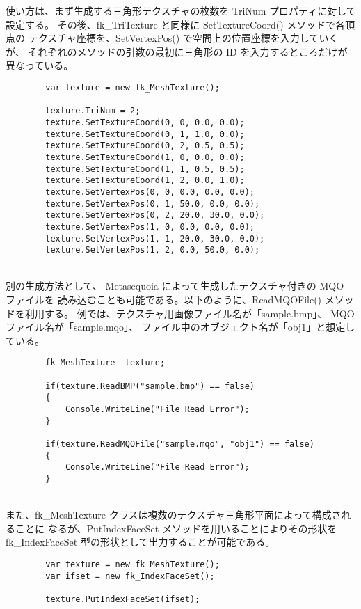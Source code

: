 使い方は、まず生成する三角形テクスチャの枚数を TriNum プロパティに対して設定する。
その後、fk\_TriTexture と同様に SetTextureCoord() メソッドで各頂点の
テクスチャ座標を、SetVertexPos() で空間上の位置座標を入力していくが、
それぞれのメソッドの引数の最初に三角形の ID を入力するところだけが異なっている。
\\
\begin{breakbox}
\begin{verbatim}
        var texture = new fk_MeshTexture();

        texture.TriNum = 2;
        texture.SetTextureCoord(0, 0, 0.0, 0.0);
        texture.SetTextureCoord(0, 1, 1.0, 0.0);
        texture.SetTextureCoord(0, 2, 0.5, 0.5);
        texture.SetTextureCoord(1, 0, 0.0, 0.0);
        texture.SetTextureCoord(1, 1, 0.5, 0.5);
        texture.SetTextureCoord(1, 2, 0.0, 1.0);
        texture.SetVertexPos(0, 0, 0.0, 0.0, 0.0);
        texture.SetVertexPos(0, 1, 50.0, 0.0, 0.0);
        texture.SetVertexPos(0, 2, 20.0, 30.0, 0.0);
        texture.SetVertexPos(1, 0, 0.0, 0.0, 0.0);
        texture.SetVertexPos(1, 1, 20.0, 30.0, 0.0);
        texture.SetVertexPos(1, 2, 0.0, 50.0, 0.0);
\end{verbatim}
\end{breakbox}
~ \\
別の生成方法として、
Metasequoia によって生成したテクスチャ付きの MQO ファイルを
読み込むことも可能である。以下のように、ReadMQOFile() メソッドを利用する。
例では、テクスチャ用画像ファイル名が「sample.bmp」、
MQO ファイル名が「sample.mqo」、
ファイル中のオブジェクト名が「obj1」と想定している。
\\
\begin{breakbox}
\begin{verbatim}
        fk_MeshTexture  texture;

        if(texture.ReadBMP("sample.bmp") == false)
        {
            Console.WriteLine("File Read Error");
        }

        if(texture.ReadMQOFile("sample.mqo", "obj1") == false)
        {
            Console.WriteLine("File Read Error");
        }
\end{verbatim}
\end{breakbox}
~ \\
また、fk\_MeshTexture クラスは複数のテクスチャ三角形平面によって構成されることに
なるが、PutIndexFaceSet メソッドを用いることによりその形状を
fk\_IndexFaceSet 型の形状として出力することが可能である。
\\
\begin{breakbox}
\begin{verbatim}
        var texture = new fk_MeshTexture();
        var ifset = new fk_IndexFaceSet();

        texture.PutIndexFaceSet(ifset);
\end{verbatim}
\end{breakbox}

